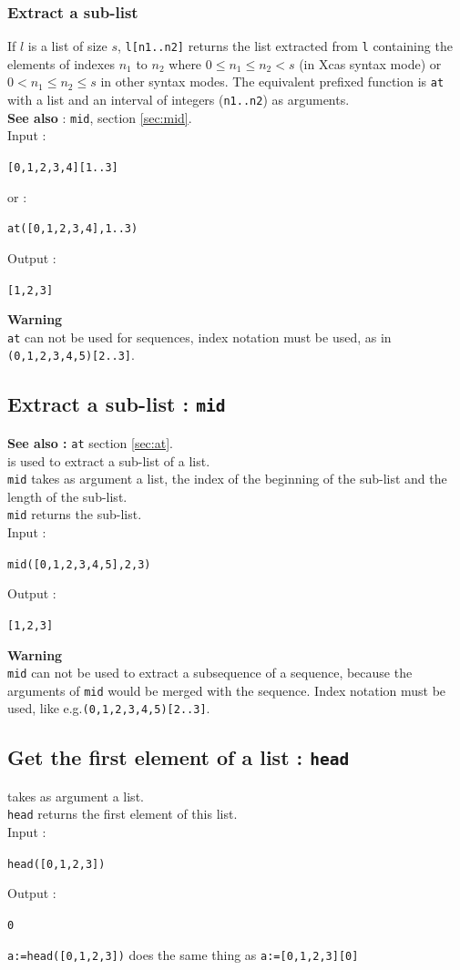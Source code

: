 \documentclass[a4paper,11pt]{book}
\begin{document}
\subsubsection{Extract a sub-list}
If $l$ is a list of size $s$, {\tt l[n1..n2]} returns the list
extracted from {\tt l} containing the elements of indexes $n_1$ to $n_2$
where $0 \leq n_1\leq n_2 < s$ (in Xcas syntax mode) or
$0 < n_1\leq n_2 \leq s$ in other syntax modes.
The equivalent prefixed function is
{\tt at} with a list and an interval of integers ({\tt n1..n2}) 
as arguments.\\
{\bf See also} : {\tt mid}, section \ref{sec:mid}.\\
Input :
\begin{center}{\tt [0,1,2,3,4][1..3]}\end{center}
or :
\begin{center}{\tt at([0,1,2,3,4],1..3)}\end{center}
Output :
\begin{center}{\tt  [1,2,3]}\end{center}
{\bf Warning}\\
{\tt at} can not be used for sequences, index notation
must be used, as in {\tt (0,1,2,3,4,5)[2..3]}. 


\subsection{Extract a sub-list : {\tt mid}}\label{sec:mid}
{\bf See also :} {\tt at} section \ref{sec:at}.\\
 is used to extract a sub-list of a list.\\
{\tt mid} takes as argument a list, the index of the beginning of the 
sub-list and the length of the sub-list.\\
{\tt mid} returns the sub-list.\\
Input :
\begin{center}{\tt mid([0,1,2,3,4,5],2,3)}\end{center}
Output :
\begin{center}{\tt  [1,2,3]}\end{center}
{\bf Warning}\\
{\tt mid} can not be used to extract a subsequence of a sequence,
because the arguments of {\tt mid} would be merged with the sequence.
Index notation must be used, like e.g.{\tt (0,1,2,3,4,5)[2..3]}. 

\subsection{Get the first element of a list : {\tt head}}
 takes as argument a list.\\
{\tt head} returns the first element of this list.\\
Input :
\begin{center}{\tt head([0,1,2,3])}\end{center}
Output :
\begin{center}{\tt  0}\end{center}
{\tt a:=head([0,1,2,3])} does the same thing as {\tt a:=[0,1,2,3][0]}
\end{document}
